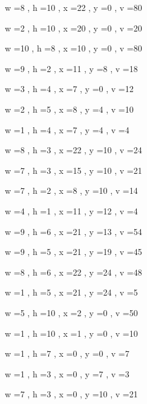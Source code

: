 \documentclass[11pt]{article}
\begin{document}
w =8 , h =10 , x =22 , y =0 , v =80
\par
w =2 , h =10 , x =20 , y =0 , v =20
\par
w =10 , h =8 , x =10 , y =0 , v =80
\par
w =9 , h =2 , x =11 , y =8 , v =18
\par
w =3 , h =4 , x =7 , y =0 , v =12
\par
w =2 , h =5 , x =8 , y =4 , v =10
\par
w =1 , h =4 , x =7 , y =4 , v =4
\par
w =8 , h =3 , x =22 , y =10 , v =24
\par
w =7 , h =3 , x =15 , y =10 , v =21
\par
w =7 , h =2 , x =8 , y =10 , v =14
\par
w =4 , h =1 , x =11 , y =12 , v =4
\par
w =9 , h =6 , x =21 , y =13 , v =54
\par
w =9 , h =5 , x =21 , y =19 , v =45
\par
w =8 , h =6 , x =22 , y =24 , v =48
\par
w =1 , h =5 , x =21 , y =24 , v =5
\par
w =5 , h =10 , x =2 , y =0 , v =50
\par
w =1 , h =10 , x =1 , y =0 , v =10
\par
w =1 , h =7 , x =0 , y =0 , v =7
\par
w =1 , h =3 , x =0 , y =7 , v =3
\par
w =7 , h =3 , x =0 , y =10 , v =21
\par
\newpage
\end{document}
